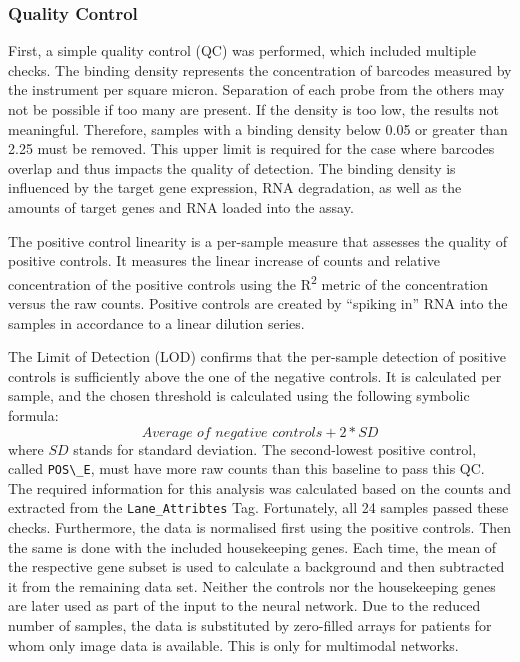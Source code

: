 \subsubsection{Quality Control}

First, a simple quality control (QC) was performed, which included multiple checks. The binding density represents the concentration of barcodes measured by the instrument per square micron. Separation of each probe from the others may not be possible if too many are present. If the density is too low, the results not meaningful. Therefore, samples with a binding density below 0.05 or greater than 2.25 must be removed. This upper limit is required for the case where barcodes overlap and thus impacts the quality of detection.  
The binding density is influenced by the target gene expression, RNA degradation, as well as the amounts of target genes and RNA loaded into the assay. \cite{NanoStringTechnologies2017Gene, Gorman2022IO}

The positive control linearity is a per-sample measure that assesses the quality of positive controls. It measures the linear increase of counts and relative concentration of the positive controls using the R\textsuperscript{2} metric of the concentration versus the raw counts. Positive controls are created by “spiking in” RNA into the samples in accordance to a linear dilution series. \cite{NanoStringTechnologies2017Gene, Gorman2022IO}

The Limit of Detection (LOD) confirms that the per-sample detection of positive controls is sufficiently above the one of the negative controls. It is calculated per sample, and the chosen threshold is calculated using the following symbolic formula:
\[ \textit{Average of negative controls} + 2 * SD \]
where \(SD\) stands for standard deviation. The second-lowest positive control, called \verb|POS\_E|, must have more raw counts than this baseline to pass this QC. The required information for this analysis was calculated based on the counts and extracted from the \verb|Lane_Attribtes| Tag. Fortunately, all 24 samples passed these checks.
Furthermore, the data is normalised first using the positive controls. Then the same is done with the included housekeeping genes. Each time, the mean of the respective gene subset is used to calculate a background and then subtracted it from the remaining data set. Neither the controls nor the housekeeping genes are later used as part of the input to the neural network.
Due to the reduced number of samples, the data is substituted by zero-filled arrays for patients for whom only image data is available. This is only for multimodal networks.
\cite{Gorman2022IO}

